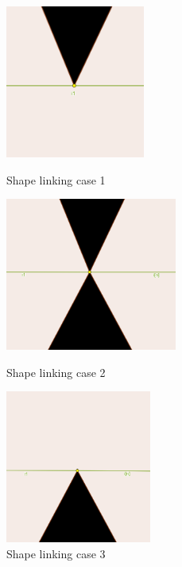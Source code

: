 \documentclass[12pt]{article}
\begin{document}
\begin{figure}[H]
  \centering
  \includegraphics[height=5cm]{Images/intersection_case1.png}
  \caption{Shape linking case 1}
  \label{fig:intersectionIntervalCase1}
\endminipage\hfill
{}
  \centering
  \includegraphics[height=5cm]{Images/intersection_case2.png}
  \caption{Shape linking case 2}
  \label{fig:intersecionIntervalCase2}
\endminipage\hfill
{}
  \centering
  \includegraphics[height=5cm]{Images/intersection_case3.png}
  \caption{Shape linking case 3}
  \label{fig:intersecionIntervalCase3}
\endminipage
\end{figure}
\end{document}
